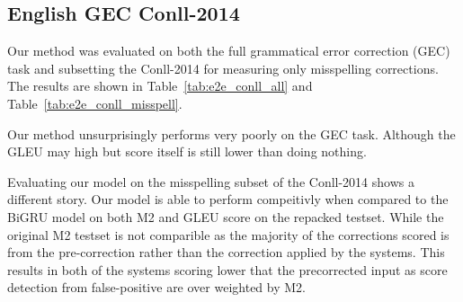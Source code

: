 \subsection{English GEC Conll-2014}

Our method was evaluated on both the full grammatical error correction (GEC) task and subsetting the Conll-2014 for measuring only misspelling corrections. The results are shown in Table~\ref{tab:e2e_conll_all} and Table~\ref{tab:e2e_conll_misspell}.

Our method unsurprisingly performs very poorly on the GEC task. Although the GLEU may high but score itself is still lower than doing nothing.

Evaluating our model on the misspelling subset of the Conll-2014 shows a different story. Our model is able to perform compeitivly when compared to the BiGRU model on both M2 and GLEU score on the repacked testset. While the original M2 testset is not comparible as the majority of the corrections scored is from the pre-correction rather than the correction applied by the systems. This results in both of the systems scoring lower that the precorrected input as score detection from false-positive are over weighted by M2.
